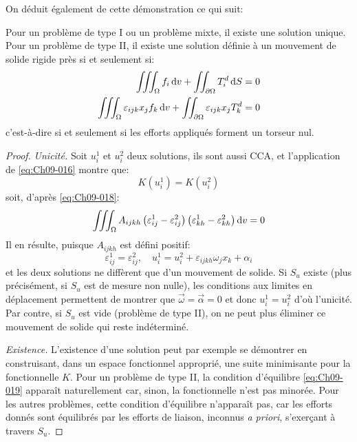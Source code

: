 On déduit également de cette démonstration ce qui suit: 
\begin{thm}
    Pour un problème de type I ou un problème mixte, il existe une solution unique.
    Pour un problème de type II, il existe une solution définie à un mouvement de solide rigide près si et seulement si:
    \begin{equation}
        \begin{split}
            \iiint_{\Omega} f_i \mathop{\mathrm{{}d}}\mathopen{} v + \iint_{\partial \Omega} T_i^d \mathop{\mathrm{{}d}}\mathopen{} S = 0 \\
            \iiint_{\Omega} \varepsilon_{ijk} x_{j} f_k \mathop{\mathrm{{}d}}\mathopen{} v + \iint_{\partial \Omega} \varepsilon_{ijk} x_j T_k^d = 0
        \end{split}
        \label{eq:Ch09-019}
    \end{equation}
    c'est-à-dire si et seulement si les efforts appliqués forment un torseur nul. 
\end{thm}
\begin{proof}
    \textit{Unicité.}
    Soit $u_i^1$ et $u_i^2$ deux solutions, ils sont aussi CCA, et l'application de \eqref{eq:Ch09-016} montre que: 
    \begin{displaymath}
        K\left( u_i^1 \right) = K \left( u_i^2 \right)
    \end{displaymath}
    soit, d'après \eqref{eq:Ch09-018}:
    \begin{eqnarray}
        \iiint_{\Omega} A_{ijkh} \left( \varepsilon_{ij}^1 - \varepsilon_{ij}^2 \right) \left( \varepsilon_{kh}^1 - \varepsilon_{kh}^2 \right) \mathop{\mathrm{{}d}}\mathopen{} v = 0
        \label{eq:Ch09-020}
    \end{eqnarray}
    Il en résulte, puisque $A_{ijkh}$ est défini positif:
    \begin{equation}
        \varepsilon_{ij}^1 = \varepsilon_{ij}^2,\quad u_i^1 = u_i^2 + \varepsilon_{ijkh} \omega_j x_k + \alpha_i
        \label{eq:Ch09-021}
    \end{equation}
    et les deux solutions ne diffèrent que d'un mouvement de solide.
    Si $S_u$ existe (plus précisément, si $S_u$ est de mesure non nulle), les conditions aux limites en déplacement permettent de montrer que $\vec{\omega} = \vec{\alpha} = 0$ et donc $u_i^1 = u_i^2$ d'où l'unicité. 
    Par contre, si $S_u$ est vide (problème de type II), on ne peut plus éliminer ce mouvement de solide qui reste indéterminé.

    \textit{Existence.}
    L'existence d'une solution peut par exemple se démontrer en construisant, dans un espace fonctionnel approprié, une suite minimisante pour la fonctionnelle $K$.
    Pour un problème de type II, la condition d'équilibre \eqref{eq:Ch09-019} apparaît naturellement car, sinon, la fonctionnelle n'est pas minorée. 
    Pour les autres problèmes, cette condition d'équilibre n'apparaît pas, car les efforts donnés sont équilibrés par les efforts de liaison, inconnus \textit{a priori}, s'exerçant à travers $S_u$.
\end{proof}
